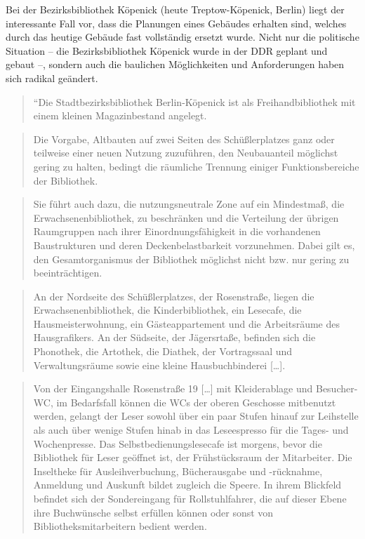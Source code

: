 \documentclass[a4paper,
fontsize=11pt,
oneside,
numbers=noperiodatend,
parskip=half-,
bibliography=totoc,
final
]{scrartcl}
\begin{document}
Bei der Bezirksbibliothek Köpenick (heute Treptow-Köpenick, Berlin)
liegt der interessante Fall vor, dass die Planungen eines Gebäudes
erhalten sind, welches durch das heutige Gebäude fast vollständig
ersetzt wurde. Nicht nur die politische Situation -- die
Bezirksbibliothek Köpenick wurde in der DDR geplant und gebaut --,
sondern auch die baulichen Möglichkeiten und Anforderungen haben sich
radikal geändert.

\begin{quote}
``Die Stadtbezirksbibliothek Berlin-Köpenick ist als Freihandbibliothek
mit einem kleinen Magazinbestand angelegt.
\end{quote}

\begin{quote}
Die Vorgabe, Altbauten auf zwei Seiten des Schüßlerplatzes ganz oder
teilweise einer neuen Nutzung zuzuführen, den Neubauanteil möglichst
gering zu halten, bedingt die räumliche Trennung einiger
Funktionsbereiche der Bibliothek.
\end{quote}

\begin{quote}
Sie führt auch dazu, die nutzungsneutrale Zone auf ein Mindestmaß, die
Erwachsenenbibliothek, zu beschränken und die Verteilung der übrigen
Raumgruppen nach ihrer Einordnungsfähigkeit in die vorhandenen
Baustrukturen und deren Deckenbelastbarkeit vorzunehmen. Dabei gilt es,
den Gesamtorganismus der Bibliothek mög\-lichst nicht bzw. nur gering zu
beeinträchtigen.
\end{quote}

\begin{quote}
An der Nordseite des Schüßlerplatzes, der Rosenstraße, liegen die
Erwachsenenbibliothek, die Kinderbibliothek, ein Lesecafe, die
Hausmeisterwohnung, ein Gäste\-appar\-tement und die Arbeitsräume des
Hausgrafikers. An der Südseite, der Jäger\-srtaße, befinden sich die
Phonothek, die Artothek, die Diathek, der Vortragssaal und
Verwaltungsräume sowie eine kleine Hausbuchbinderei {[}\ldots{}{]}.
\end{quote}

\begin{quote}
Von der Eingangshalle Rosenstraße 19 {[}\ldots{}{]} mit Kleiderablage
und Besucher-WC, im Bedarfsfall können die WCs der oberen Geschosse
mitbenutzt werden, gelangt der Leser sowohl über ein paar Stufen hinauf
zur Leihstelle als auch über wenige Stufen hinab in das Leseespresso für
die Tages- und Wochenpresse. Das Selbstbedienungslesecafe ist morgens,
bevor die Bibliothek für Leser geöffnet ist, der Frühstücksraum der
Mitarbeiter. Die Inseltheke für Ausleihverbuchung, Bücherausgabe und
-rück\-nah\-me, Anmeldung und Auskunft bildet zugleich die Speere. In ihrem
Blickfeld befindet sich der Sondereingang für Rollstuhlfahrer, die auf
dieser Ebene ihre Buch\-wünsche selbst erfüllen können oder sonst von
Bibliotheksmitarbeitern bedient werden.
\end{quote}
\end{document}
